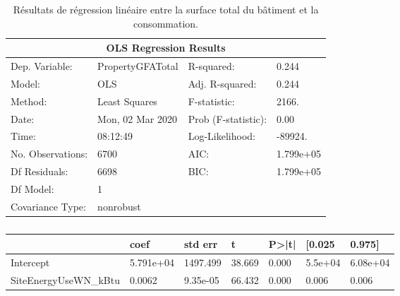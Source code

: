 \begin{table*}[p]
\centering
\caption{Résultats de régression linéaire entre la surface total du bâtiment
et la consommation.}
\begin{tabular}{@{}llll@{}}
\toprule
\multicolumn{4}{c}{OLS Regression Results}                             \\ \midrule
Dep. Variable:    & PropertyGFATotal & R-squared:          & 0.244     \\
Model:            & OLS              & Adj. R-squared:     & 0.244     \\
Method:           & Least Squares    & F-statistic:        & 2166.     \\
Date:             & Mon, 02 Mar 2020 & Prob (F-statistic): & 0.00      \\
Time:             & 08:12:49         & Log-Likelihood:     & -89924.   \\
No. Observations: & 6700             & AIC:                & 1.799e+05 \\
Df Residuals:     & 6698             & BIC:                & 1.799e+05 \\
Df Model:         & 1                &                     &           \\
Covariance Type:  & nonrobust        &                     &           \\ \bottomrule
\end{tabular}
\end{table*}

\begin{table*}[p]
  \caption{}

  \centering
\begin{tabular}{@{}lllllll@{}}
\toprule
  & coef                  & std err   & t        & P\textgreater{}|t| & {[}0.025 & 0.975{]}         \\ \midrule
Intercept             & 5.791e+04 & 1497.499 & 38.669             & 0.000    & 5.5e+04  & 6.08e+04 \\
SiteEnergyUseWN\_kBtu & 0.0062    & 9.35e-05 & 66.432             & 0.000    & 0.006    & 0.006    \\ \bottomrule
\end{tabular}
\end{table*}

